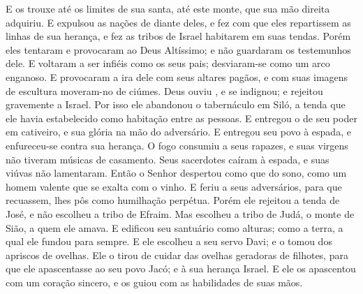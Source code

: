 {  E os trouxe até os limites de sua
{} santa, até este monte, que sua mão direita adquiriu.
  E expulsou as nações de diante deles, e fez com que eles repartissem as linhas de sua herança, e fez as tribos de Israel habitarem em suas tendas.
  Porém eles tentaram e provocaram ao Deus Altíssimo; e não guardaram os testemunhos dele.
  E voltaram a ser
{} infiéis como os seus pais; desviaram-se como um arco enganoso.
  E provocaram a ira dele com seus altares pagãos,
 e com suas imagens de escultura moveram-no de ciúmes.
  Deus ouviu
{},  e se indignou; e rejeitou gravemente a Israel.
  Por isso ele abandonou o tabernáculo em Siló, a tenda que ele havia estabelecido como habitação entre as pessoas.
  E entregou o
{} de seu poder em cativeiro, e sua glória na mão do adversário.
  E entregou seu povo à espada, e enfureceu-se contra sua herança.
  O fogo consumiu a seus rapazes, e suas virgens não tiveram músicas de casamento.
  Seus sacerdotes caíram à espada, e suas viúvas não lamentaram.
  Então o Senhor despertou como que do sono, como um homem valente que se exalta com o vinho.
  E feriu a seus adversários, para que recuassem,
{} lhes pôs como humilhação perpétua.
  Porém ele rejeitou a tenda de José, e não escolheu a tribo de Efraim.
  Mas escolheu a tribo de Judá, o monte de Sião, a quem ele amava.
  E edificou seu santuário como alturas; como a terra, a qual ele fundou para sempre.
  E ele escolheu a seu servo Davi; e o tomou dos apriscos de ovelhas.
  Ele o tirou de cuidar das ovelhas geradoras de filhotes, para que ele apascentasse ao seu povo Jacó; e à sua herança Israel.
  E ele os apascentou com um coração sincero, e os guiou com as habilidades de suas mãos.
\par }


